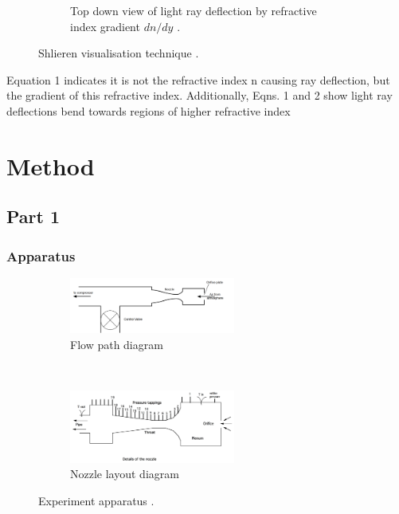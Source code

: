 \documentclass{article}
\begin{document}
\begin{figure}[H]
\begin{subfigure}[t]{0.48\textwidth}
        \caption{Top down view of light ray deflection by refractive index gradient $dn/dy$ \cite{Mazumdar_Amrita:2013}.}
        \label{fig:refraction_diagram}
    \end{subfigure}
    \caption{Shlieren visualisation technique \cite{Mazumdar_Amrita:2013}.}
\end{figure}

Equation 1 indicates it is not the refractive index n causing ray deflection, but the gradient of
this refractive index. Additionally, Eqns. 1 and 2 show light ray deflections bend towards regions of higher
refractive index


\section{Method}
\subsection{Part 1}
\subsubsection{Apparatus}

\begin{figure}[H]
    \centering
    \begin{subfigure}{0.8\textwidth}
        \centering
        \includegraphics[width=0.6\textwidth]{flow_layout.png}
        \caption{Flow path diagram}
        \label{fig:flow_layout}
    \end{subfigure}
    ~
    \begin{subfigure}{0.8\textwidth}
        \centering
        \includegraphics[width=0.6\textwidth]{../Supersonic_Nozzle/small_nozzle_layout.png}
        \caption{Nozzle layout diagram}
        \label{fig:nozzle_layout}
    \end{subfigure}
    \caption{Experiment apparatus \cite{lab_manual}.}
\end{figure}
\end{document}
